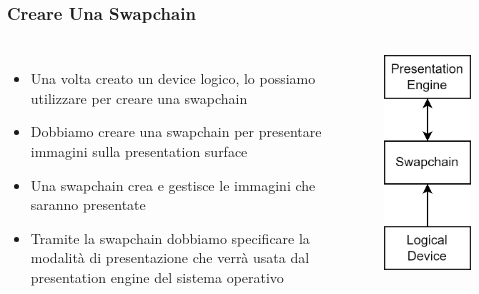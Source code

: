 \begin{frame}
\frametitle{Creare Una Swapchain}
\begin{columns}


\begin{itemize}
\item Una volta creato un device logico, lo possiamo utilizzare per creare una swapchain
\item Dobbiamo creare una swapchain per presentare immagini sulla presentation surface
\item Una swapchain crea e gestisce le immagini che saranno presentate
\item Tramite la swapchain dobbiamo specificare la modalità di presentazione che verrà usata dal presentation engine del sistema operativo
\end{itemize}


\begin{figure}[ht]
    \centering
    \includegraphics[scale=0.2]{images/SlidesInitializingVulkan/Swapchain.png}
\end{figure}

\end{columns}
\end{frame}
